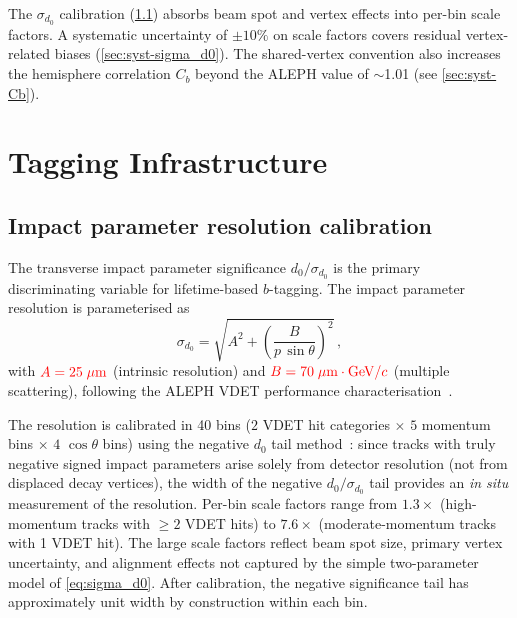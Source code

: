 \documentclass[11pt,a4paper]{article}
\newcommand{\external}[1]{\textcolor{red}{#1}}
\begin{document}
The $\sigma_{d_0}$ calibration (\cref{sec:tagging:sigma_d0})
absorbs beam spot and vertex effects into per-bin scale factors.
A systematic uncertainty of $\pm 10\%$ on scale factors covers
residual vertex-related biases (\cref{sec:syst-sigma_d0}).
The shared-vertex convention also increases the hemisphere
correlation $C_b$ beyond the ALEPH value of $\sim$1.01
(see \cref{sec:syst-Cb}).

\section{Tagging Infrastructure}
\label{sec:tagging}

\subsection{Impact parameter resolution calibration}
\label{sec:tagging:sigma_d0}

The transverse impact parameter significance $d_0/\sigma_{d_0}$ is
the primary discriminating variable for lifetime-based $b$-tagging.
The impact parameter resolution is parameterised as
\begin{equation}
\sigma_{d_0} = \sqrt{A^2 + \left(\frac{B}{p\,\sin\theta}\right)^2}\,,
\label{eq:sigma_d0}
\end{equation}
with $\external{A = 25\;\mu\text{m}}$ (intrinsic resolution) and
$\external{B = 70\;\mu\text{m}\cdot\text{GeV}/c}$ (multiple
scattering), following the ALEPH VDET performance
characterisation~\cite{ALEPH:Rb:precise}.

The resolution is calibrated in 40 bins ($2$ VDET hit categories
$\times$ $5$ momentum bins $\times$ $4$ $\cos\theta$ bins) using
the negative $d_0$ tail method~\cite{ALEPH:Rb:precise}: since
tracks with truly negative signed impact parameters arise solely
from detector resolution (not from displaced decay vertices), the
width of the negative $d_0/\sigma_{d_0}$ tail provides an
\textit{in situ} measurement of the resolution.
Per-bin scale factors range from $1.3\times$ (high-momentum tracks
with $\geq 2$ VDET hits) to $7.6\times$ (moderate-momentum tracks
with 1 VDET hit).
The large scale factors reflect beam spot size, primary vertex
uncertainty, and alignment effects not captured by the simple
two-parameter model of \cref{eq:sigma_d0}.
After calibration, the negative significance tail has approximately
unit width by construction within each bin.
\end{document}
